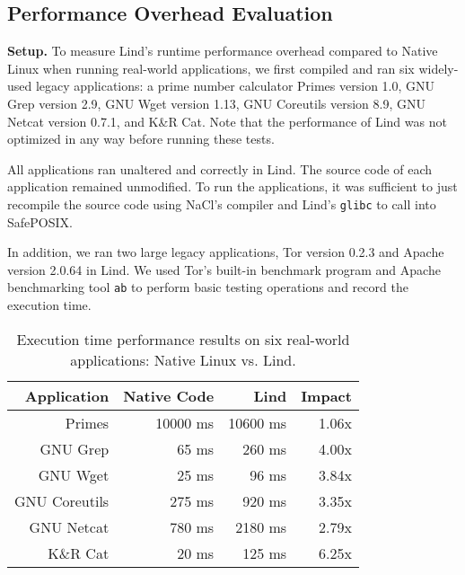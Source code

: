 {{\subsection{Performance Overhead Evaluation}
\label{Performance-Evaluation}


\noindent
\textbf{Setup.}
To measure Lind's runtime performance overhead compared to Native Linux
 when running real-world applications, 
we first compiled and ran six widely-used legacy applications:
a prime number calculator Primes version 1.0,
GNU Grep version 2.9, GNU Wget version 1.13, GNU Coreutils version 8.9,
GNU Netcat version 0.7.1, and K\&R Cat. Note that the performance of Lind 
was not optimized in any way before running these tests.

All applications ran unaltered and correctly in Lind. The source code of each application remained
unmodified. To run the applications, it was sufficient to just recompile the
source code using NaCl's compiler and Lind's \texttt{glibc} to call
into SafePOSIX.

In addition, we ran two large legacy applications, Tor version 0.2.3 and Apache version 2.0.64 in Lind.
We used Tor's built-in benchmark program and Apache benchmarking tool \texttt{ab} to perform
basic testing operations and record the execution time.

\begin{table}
\centering
\scriptsize
\begin{tabular}{|r|r|r|r|}
  \hline
  {\bf Application} & {\bf Native Code} & {\bf Lind} & {\bf Impact}  \\
  \hline
  Primes & 10000 ms & 10600 ms & 1.06x \\
  GNU Grep & 65 ms & 260 ms & 4.00x \\
  GNU Wget & 25 ms & 96 ms & 3.84x \\
  GNU Coreutils & 275 ms & 920 ms & 3.35x \\
  GNU Netcat & 780 ms & 2180 ms & 2.79x \\
  K\&R Cat & 20 ms & 125 ms & 6.25x \\
  \hline
\end{tabular}
\caption{\small Execution time performance results on six real-world applications: Native
Linux vs. Lind.}
\label{table:performance_apps}
\end{table}

}}

